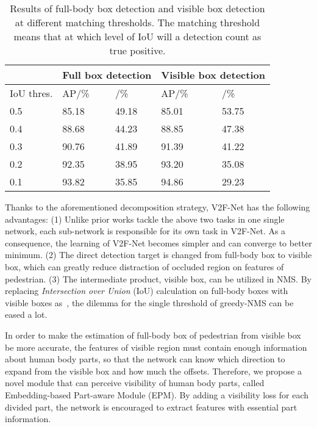 \documentclass[10pt,twocolumn,letterpaper]{article}
\begin{document}
\begin{table}[ht]
	\centering
  \caption{Results of full-body box detection and visible box detection at different matching thresholds. The matching threshold means that at which level of IoU will a detection count as true positive. }
	\label{tbl:crowdhuman_iou}
	\footnotesize
	\begin{tabularx}{1.\linewidth}{X<{\centering}|X<{\centering}X<{\centering}|X<{\centering}X<{\centering}}
		\toprule
		& \multicolumn{2}{|c|}{Full box detection} & \multicolumn{2}{|c}{Visible box detection} \\
		\hline
		   IoU thres.& AP/\% & /\%  &  AP/\% & /\%  \\
		\hline
		0.5 & 85.18 & 49.18  &85.01 &53.75  \\
		\hline
		0.4  &88.68&44.23  &88.85&47.38\\
		\hline
		0.3  &90.76&41.89 &91.39&41.22  \\
		\hline
		0.2  &92.35&38.95  &93.20&35.08  \\
		\hline
		0.1 &93.82&35.85  &94.86&29.23  \\
		
		\bottomrule
	\end{tabularx}
\end{table}


Thanks to the aforementioned decomposition strategy, V2F-Net has the following advantages: (1) Unlike prior works tackle the above two tasks in one single network, each sub-network is responsible for its own task in V2F-Net. As a consequence, the learning of V2F-Net becomes simpler and can converge to better minimum. (2) The direct detection target is changed from full-body box to visible box, which can greatly reduce distraction of occluded region on features of pedestrian. (3) The intermediate product, visible box, can be utilized in NMS. By replacing \textit{Intersection over Union} (IoU) calculation on full-body boxes with visible boxes as~\cite{huang2020R2nms}, the dilemma for the single threshold of greedy-NMS can be eased a lot. 

In order to make the estimation of full-body box of pedestrian from visible box be more accurate, the features of visible region must contain enough information about human body parts, so that the network can know which direction to expand from the visible box and how much the offsets. Therefore, we propose a novel module that can perceive visibility of human body parts, called Embedding-based Part-aware Module (EPM). By adding a visibility loss for each divided part, the network is encouraged to extract features with essential part information. 
\end{document}
